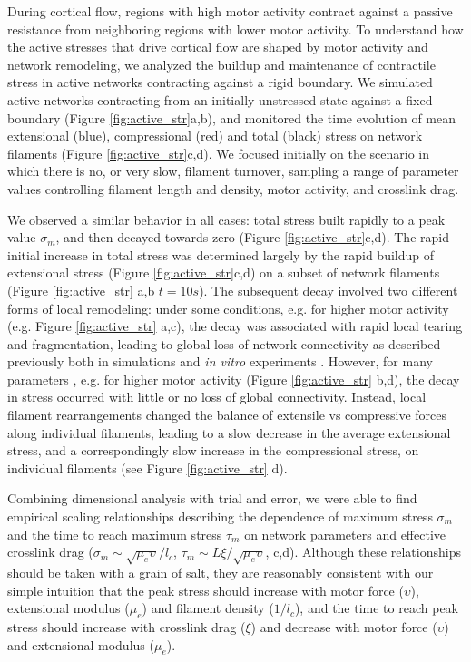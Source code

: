 \documentclass[10pt,letterpaper]{article}
\begin{document}
During cortical flow, regions with high motor activity contract against a passive resistance from neighboring regions with lower motor activity.  To understand how the active stresses that drive cortical flow are shaped by motor activity and network remodeling, we analyzed the buildup and maintenance of contractile stress in active networks contracting against a rigid boundary. We simulated active networks contracting from an initially unstressed state against a fixed boundary (Figure \ref{fig:active_str}a,b), and  monitored the time evolution of mean extensional (blue), compressional (red) and total (black) stress on network filaments (Figure \ref{fig:active_str}c,d). We focused initially on the scenario in which there is no, or very slow, filament turnover, sampling a range of parameter values controlling filament length and density, motor activity, and crosslink drag. 

We observed a similar behavior in all cases: total stress built rapidly to a peak value $\sigma_m$, and then decayed towards zero (Figure \ref{fig:active_str}c,d).  The rapid initial increase in total stress was determined largely by the rapid buildup of extensional stress (Figure \ref{fig:active_str}c,d) on a subset of network filaments (Figure \ref{fig:active_str} a,b $t=10s$). The subsequent decay involved two different forms of local remodeling: under some conditions, e.g. for higher motor activity (e.g. Figure \ref{fig:active_str} a,c), the decay was associated with rapid local tearing and fragmentation, leading to global loss of network connectivity as described previously both in simulations\cite{Mak:2016aa} and {\em in vitro}  experiments \cite{Alvarado:2013aa}.  However, for many parameters , e.g. for higher motor activity (Figure \ref{fig:active_str} b,d), the decay in stress occurred with little or no loss of global connectivity.  Instead, local filament rearrangements changed the balance of extensile vs compressive forces along individual filaments, leading to a slow decrease in the average extensional stress, and a correspondingly slow increase in the compressional stress, on individual filaments (see Figure \ref{fig:active_str} d).  

Combining dimensional analysis with trial and error, we were able to find empirical scaling relationships describing the dependence of maximum stress $\sigma_m$ and the time to reach maximum stress $\tau_m$ on network parameters and effective crosslink drag  ($\sigma_m \sim \sqrt{\mu_e\upsilon}/l_c$, $\tau_m\sim L\xi/\sqrt{\mu_e\upsilon}$, c,d). Although these relationships should be taken with a grain of salt, they are reasonably consistent with our simple intuition that the peak stress should increase with motor force ($\upsilon$), extensional modulus ($\mu_e$) and filament density ($1/l_c$), and the time to reach peak stress should increase with crosslink drag ($\xi$) and decrease with motor force ($\upsilon$) and extensional modulus ($\mu_e$).  
\end{document}
